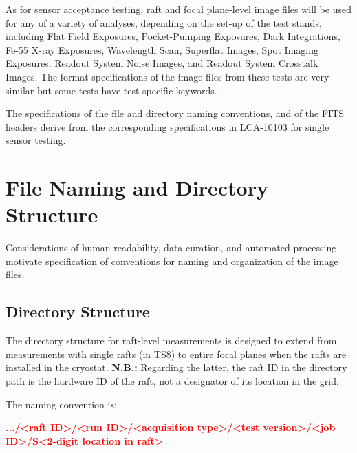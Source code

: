 \documentclass{article}[12pt]
\newcommand{\red}{\textcolor{red}}
\begin{document}
As for sensor acceptance testing, raft and focal plane-level image files will be used for any of a variety of analyses, depending on the set-up of the test stands, including Flat Field Exposures, Pocket-Pumping Exposures, Dark Integrations, Fe-55 X-ray Exposures, Wavelength Scan, Superflat Images, Spot Imaging Exposures, Readout System Noise Images, and Readout System Crosstalk Images.
The format specifications of the image files from these tests are very similar but some tests have test-specific keywords.  

The specifications of the file and directory naming conventions, and of the FITS headers derive from the corresponding specifications in LCA-10103 for single sensor testing.

\section{File Naming and Directory Structure}
Considerations of human readability, data curation, and automated processing motivate specification of conventions for naming and organization of the image files.

\subsection{Directory Structure}

The directory structure for raft-level measurements is designed to extend from measurements with single rafts (in TS8) to entire focal planes when the rafts are installed in the cryostat.  {\bf N.B.:} Regarding the latter, the raft ID in the directory path is the hardware ID of the raft, not a designator of its location in the grid. 

The naming convention is:


\red{{\bf .../<raft ID>/<run ID>/<acquisition type>/<test version>/<job ID>/S<2-digit location in raft>}}
\end{document}
